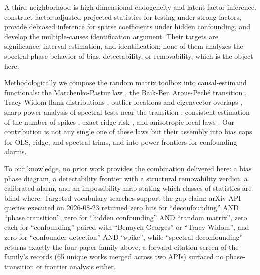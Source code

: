 A third neighborhood is high-dimensional endogeneity and latent-factor inference. \citet{fan2014endogeneity} construct factor-adjusted projected statistics for testing under strong factors, \citet{guo2022ddll} provide debiased inference for sparse coefficients under hidden confounding, and \citet{wang2019blessings} develop the multiple-causes identification argument. Their targets are significance, interval estimation, and identification; none of them analyzes the spectral phase behavior of bias, detectability, or removability, which is the object here.

Methodologically we compose the random matrix toolbox into causal-estimand functionals: the Marchenko-Pastur law \citep{marchenko1967distribution}, the Baik-Ben Arous-Pech\'e transition \citep{bbp2005phase}, Tracy-Widom flank distributions \citep{johnstone2001distribution}, outlier locations and eigenvector overlaps \citep{benaychgeorges2011eigenvalues,benaychgeorges2012singular}, sharp power analysis of spectral tests near the transition \citep{onatski2013asymptotic}, consistent estimation of the number of spikes \citep{onatski2010determining}, exact ridge risk \citep{dobriban2018high,hastie2022surprises}, and anisotropic local laws \citep{knowles2017anisotropic}. Our contribution is not any single one of these laws but their assembly into bias caps for OLS, ridge, and spectral trims, and into power frontiers for confounding alarms.

To our knowledge, no prior work provides the combination delivered here: a bias phase diagram, a detectability frontier with a structural removability verdict, a calibrated alarm, and an impossibility map stating which classes of statistics are blind where. Targeted vocabulary searches support the gap claim: arXiv API queries executed on 2026-08-23 returned zero hits for ``deconfounding'' AND ``phase transition'', zero for ``hidden confounding'' AND ``random matrix'', zero each for ``confounding'' paired with ``Benaych-Georges'' or ``Tracy-Widom'', and zero for ``confounder detection'' AND ``spike'', while ``spectral deconfounding'' returns exactly the four-paper family above; a forward-citation screen of the family's records (65 unique works merged across two APIs) surfaced no phase-transition or frontier analysis either.
